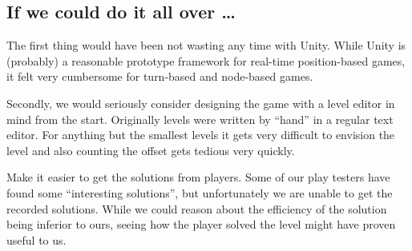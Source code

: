 

\subsection{If we could do it all over \ldots}
The first thing would have been not wasting any time with Unity.
While Unity is (probably) a reasonable prototype framework for
real-time position-based games, it felt very cumbersome for turn-based
and node-based games.

Secondly, we would seriously consider designing the game with a level
editor in mind from the start.  Originally levels were written by
``hand'' in a regular text editor.  For anything but the smallest
levels it gets very difficult to envision the level and also counting
the offset gets tedious very quickly.

Make it easier to get the solutions from players.  Some of our play
testers have found some ``interesting solutions'', but
unfortunately we are unable to get the recorded solutions.  While we
could reason about the efficiency of the solution being inferior to
ours, seeing how the player solved the level might have proven useful
to us.

